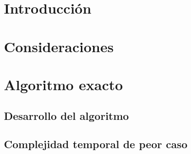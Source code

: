 \documentclass[a4paper, 10pt, twoside]{article}
\begin{document}
\newpage



\tableofcontents

\newpage



\section{Introducción}
\label{sec:introduccion}


\newpage



\section{Consideraciones}
\label{sec:consideraciones}


\newpage



\section{Algoritmo exacto}
\label{sec:algoritmo-exacto}

  \subsection{Desarrollo del algoritmo}
  \label{sub:algoritmo-exacto-desarrollo}
  

  \subsection{Complejidad temporal de peor caso}
  \label{sub:algoritmo-exacto-complejidad}
  
\end{document}
